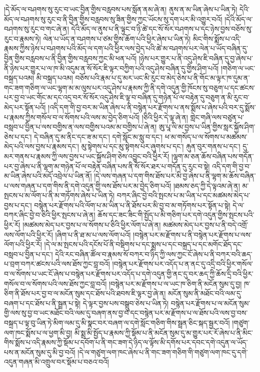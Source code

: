 །དེ་མོད་ལ་བཤགས་སུ་རུང་བ་ཡང་བྱིན་གྱིས་བརླབས་པས་སློན་ནམ་ཞེ་ན། ནུས་ན་མ་ཡིན་ཞེས་པ་ཡིན་ཏེ། དེའི་མོད་ལ་བཤགས་སུ་རུང་བ་ནི་བྱིན་གྱིས་བརླབས་སུ་ཟིན་གྱིས་ཀྱང་ཡོངས་སུ་དག་པར་མི་འགྱུར་བའོ། །དེའི་མོད་ལ་བཤགས་སུ་རུང་བ་གང་ཞེ་ན། དེའི་མོད་ལ་ནུས་པ་ནི་ལྟུང་བ་ཉི་ཚེ་དང་སོ་སོར་བཤགས་པ་དང་ཉེས་བྱས་བཅོས་སུ་རུང་བ་རྣམས་ཏེ། ལེན་པ་ཡོད་ན་བཤགས་པ་ཙམ་གྱིས་ཆོག་པའི་ཕྱིར་ཞེས་པ་ཡིན་ཏེ། མིང་གིས་སྨོས་པ་འདི་རྣམས་ཀྱིས་ཉེས་པ་བཤགས་པའི་མོད་ལ་དག་པའི་ཕྱིར་ལས་བྱེད་པའི་ཚེ་མ་བཤགས་པར་ལེན་པ་ཡོད་བཞིན་དུ་བྱིན་གྱིས་བརླབས་པ་ནི་བྱིན་གྱིས་བརླབས་ཀྱང་མི་ཕན་པའོ། །ཉེས་པར་གྱུར་པ་ནི་འདུ་ཤེས་ཇི་བཞིན་དུ་བྱ་ཞེས་པ་ནི་ཉེས་པར་གྱུར་པ་ལ་ཁ་མི་འདུམ་ན་སོ་སོར་ཇི་ལྟར་བཀྱིག་པའི་འདུ་ཤེས་བཞིན་དུ་གྱིས་ཤིག་པའོ། །གཅིག་ལ་ཡང་བསྐྲད་པའམ། མི་བསྐྲད་པའམ། བཅོས་པའི་རྣམ་པ་དུ་མར་ཡང་མི་རུང་བ་མེད་ཅེས་པ་ནི་གོང་མ་ལྟར་ཁ་དུམ་ན་གང་ཟག་གཅིག་ལ་ཡང་ལྷག་མ་མ་ལུས་པར་འདུ་ཤེས་པ་རྣམས་ཀྱི་ནི་དགེ་འདུན་གྱི་ཁོངས་སུ་བཅུག་པ་དང་ཚངས་པར་བྱ་བ་ཡང་གོང་མ་དང་འདྲ་བར་སོ་སོར་འདུ་ཤེས་ཇི་ལྟ་བ་བཞིན་དུ་གཉེན་པོ་ལ་བརྟེན་དུ་བཅུག་ན་མི་རུང་བ་མེད་པར་སྟོན་པའོ། །འདི་དག་གི་བྱ་བར་མ་ཡིན་ཞེས་པ་ནི་བསྙེན་པར་རྫོགས་པ་ནས་སྨོས་པ་ཞེས་པའི་བར་དུ་སྨོས་པ་རྣམས་ཀྱིས་གསོལ་བ་ལ་སོགས་པའི་ལས་མ་བྱེད་ཅིག་པའོ། །ཅིའི་ཕྱིར་དེ་ལྟ་ཞེ་ན། གླེང་གཞི་ལས་བཙུན་པ་བསླབ་པ་བྱིན་པ་ལས་བགྱིས་ན་ལས་བགྱིས་པའམ་མ་བགྱིས་པ་ཞེ་ན། ཨུ་པཱ་ལི་མ་བྱས་པ་ཡིན་གྱིས་སླར་སྐྱོས་ཤིག་ཅེས་པ་དང་། དེ་བཞིན་དུ་མ་ནིང་དང་ཟ་མ་དང་། དགེ་སློང་མ་སླུ་བ་དང་། ཕ་མ་གསོད་པ་ལ་སོགས་པ་མཚམས་མེད་པའི་ལས་བྱས་པ་རྣམས་དང་། མུ་སྟེགས་པ་དང་མུ་སྟེགས་པར་ཞུགས་པ་དང་། རྐུན་བུར་གནས་པ་དང་། དུ་མར་གནས་པ་རྣམས་ཀྱི་ལས་བྱས་པ་ཡང་སྐྱོས་ཤིག་ཅེས་འབྱུང་བའི་ཕྱིར་རོ། །ལྷག་མ་ཅན་ཆོས་བཞིན་པས་གདོན་པར་བྱ་ཞེས་པ་ནི་ལྷག་མ་གཉེན་པོ་ལ་བརྟེན་བཞིན་པས་ནི་སོ་སོར་ཐར་པ་གདོན་དུ་རུང་བ་སྟེ། འདི་དག་གི་བྱ་བ་མ་ཡིན་ཞེས་པའི་མདོ་འབྲེལ་པ་ཡིན་ནོ། །དེ་ལས་གཞན་པ་དག་གིས་ཐོས་པར་མི་བྱ་ཞེས་པ་ནི་ལྷག་མ་ཆོས་བཞིན་པ་ལས་གཞན་པ་དག་གིས་ནི་དགེ་འདུན་གྱི་ལས་ཐོས་པར་མ་བྱེད་ཅིག་པའོ། །ཐམས་ཅད་ཀྱི་དེ་ལྟའམ་ཞེ་ན། མ་སྤངས་པ་མ་ལོག་པ་ནི་མ་གཏོགས་ཞེས་པ་ཡིན་ཏེ། བཀར་ཞིང་བྱེ་བའི་སྤངས་པ་མ་ཡིན་པ་དང་མཚམས་མེད་པ་བྱས་པ་དང་། བསྙེན་པར་རྫོགས་པའི་ལོག་པ་མ་ཡིན་པ་ནི་ཐོས་པར་མི་བྱ་བ་མ་གཏོགས་པར་སྟོན་པ་སྟེ། དེ་ལ་བཀར་ཞིང་བྱེ་བ་ཅིའི་ཕྱིར་སྤངས་པ་ཞེ་ན། ཆོས་དང་ཟང་ཟིང་གི་སྤྱོད་པ་མི་གཅིག་པར་དགེ་འདུན་གྱིས་སྤངས་པའི་ཕྱིར་རོ། །མཚམས་མེད་པར་བྱས་པ་ལ་སོགས་པ་ཅིའི་ཕྱིར་ལོག་པ་ཞེ་ན། མཚམས་མེད་པར་བྱས་པ་ནི་བདེ་འགྲོ་ལས་ལོག་པའི་ཕྱིར་རོ། །ཞིག་པ་ནི་ཐ་མ་པ་ལས་ལོག་པའོ། །བསྙེན་པར་མ་རྫོགས་པ་ནི་བསྙེན་པར་རྫོགས་པ་ལས་ལོག་པའི་ཕྱིར་རོ། །དེ་ལ་མ་སྤངས་པའི་དངོས་པོ་ནི་བསྡིགས་པ་དང་སྨྲས་པ་དང་བསྐྲད་པ་དང་མགོང་ཐོད་དང་བསླབ་པ་བྱིན་པ་དང་། དེའི་རང་བཞིན་ཚོལ་བ་རྣམས་སོ་བཀར་བ་ཉིད་ཀྱི་ལས་ཀྱང་ངོ་ཞེས་པ་ནི་བཀར་བའི་ཆད་པ་བྲག་བཀར་ཚངས་པའི་ལས་ཐོས་ཀྱང་བླ་བའོ། །བསྙེན་པར་རྫོགས་པར་འདོད་པ་ན་ནང་དུ་འདྲི་བའི་ཕྱིར་གསོལ་བ་ལ་སོགས་པ་ཡང་ངོ་ཞེས་པ་བསྙེན་པར་རྫོགས་པར་འདོད་པ་དགེ་འདུན་གྱི་ནང་དུ་བར་ཆད་ཀྱི་ཆོས་དྲི་བའི་ཕྱིར་གསོལ་བ་ལ་སོགས་པའི་ལས་ཐོས་ཀྱང་བླ་བའོ། །བསྙེན་པར་མ་རྫོགས་པ་ལ་ཡང་ཁ་ཅིག་ནི་མངོན་སུམ་དུ་བྱ། ཁ་ཅིག་ནི་ཐོས་པར་བྱ་བ་ལ་མངོན་སུམ་དང་ཐོས་པའི་ཐབས་ཇི་ལྟར་བྱ་ཞེ་ན། མངོན་སུམ་ནི་མཐོང་བའི་ལམ་དུ་བཞག་པ་དང་ཐོས་པ་ནི་སྦྲན་པ་སྟེ། དེ་ལྟར་བྱས་པས་བསྒྲུབ་ཅེས་པ་ཡིན་ཏེ། བསྙེན་པར་རྫོགས་པ་ལ་མངོན་སུམ་གྱི་ལས་སུ་བྱ་བ་ཡང་མཐོང་བའི་ལམ་དུ་བཞག་ནས་བྱ་བ་དང་བསྙེན་པར་མ་རྫོགས་པ་ལ་ཐོས་པའི་ལས་བྱ་བས་བསྐྲད་པ་ལྟ་བུ་ཡིན་ཏེ་མིག་ལམ་དུ་མི་སྣང་བར་བཞག་ལ་དགེ་སློང་གཅིག་གིས་སྦྲན་ཅིང་སྐད་སྦྱར་བའོ། །གཙུག་ལག་ཁང་སྨོས་པ་ལ་ཕྱག་མི་བྱ། མི་སྨྲ་མི་སྤྱོད་པ་རྣམས་ཀྱི་སྡོམ་པ་ནི་མངོན་སུམ་དུ་མ་གྱུར་པར་རོ་ཞེས་པ་ནི་མིང་གིས་སྨོས་པ་འདི་རྣམས་ཀྱི་སྡོམ་པ་དབོག་པ་ནི་གང་ཟག་དེ་ཉིད་ལ་ལྟོས་མི་དགོས་པར་དབང་དགེ་འདུན་ལ་ཡོད་པས་ན་མངོན་སུམ་དུ་མི་བྱ་བའོ། །དེ་ལ་གཙུག་ལག་ཁང་ཞེས་པ་ནི་གང་ཟག་གཅིག་གི་གཙུག་ལག་ཁང་དུ་དགེ་འདུན་གཞན་མི་འགྲུལ་བར་སྡོམ་པ་བཅའ་བའོ། 